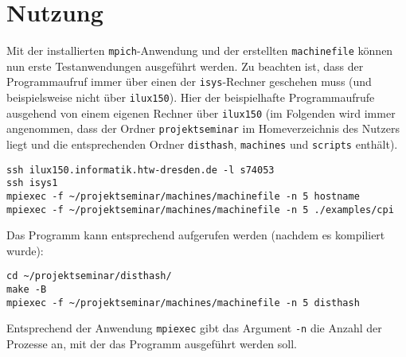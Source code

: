 \documentclass{scrreprt}
\begin{document}
\section{Nutzung}

Mit der installierten \lstinline`mpich`-Anwendung und der erstellten \lstinline`machinefile` können nun erste Testanwendungen ausgeführt werden. Zu beachten ist, dass der Programmaufruf immer über einen der \lstinline`isys`-Rechner geschehen muss (und beispielsweise nicht über \lstinline|ilux150|). Hier der beispielhafte Programmaufrufe ausgehend von einem eigenen Rechner über \lstinline`ilux150` (im Folgenden wird immer angenommen, dass der Ordner \lstinline`projektseminar` im Homeverzeichnis des Nutzers liegt und die entsprechenden Ordner \lstinline`disthash`, \lstinline`machines` und \lstinline`scripts` enthält).
\begin{lstlisting}
ssh ilux150.informatik.htw-dresden.de -l s74053
ssh isys1
mpiexec -f ~/projektseminar/machines/machinefile -n 5 hostname
mpiexec -f ~/projektseminar/machines/machinefile -n 5 ./examples/cpi
\end{lstlisting}

Das Programm kann entsprechend aufgerufen werden (nachdem es kompiliert wurde):

\begin{lstlisting}
cd ~/projektseminar/disthash/
make -B
mpiexec -f ~/projektseminar/machines/machinefile -n 5 disthash
\end{lstlisting}

Entsprechend der Anwendung \lstinline`mpiexec` gibt das Argument \lstinline`-n` die Anzahl der Prozesse an, mit der das Programm ausgeführt werden soll.
\end{document}
